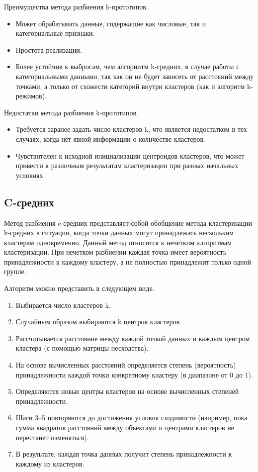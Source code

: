 Преимущества метода разбиения k-прототипов.

\begin{itemize}
    \item Может обрабатывать данные, содержащие как числовые, так и категориальные признаки.
    \item Простота реализации.
    \item Более устойчив к выбросам, чем алгориитм k-средних, в случае работы с категориальными данными, так как он не будет зависеть от расстояний между точками, а только от схожести категорий внутри кластеров (как и алгоритм k-режимов).
\end{itemize}

Недостатки метода разбиения k-прототипов.

\begin{itemize}
    \item Требуется заранее задать число кластеров k, что является недостатком в тех случаях, когда нет явной информации о количестве кластеров.
    \item Чувствителен к исходной инициализации центроидов кластеров, что может привести к различным результатам кластеризации при разных начальных условиях.
\end{itemize}


\subsection{C-средних}

Метод разбиения c-средних \cite{CmeansСlustering} представляет собой обобщение метода кластеризации k-средних в ситуации, когда точки данных могут принадлежать нескольким кластерам одновременно. Данный метод относится к нечетким алгоритмам кластеризации. При нечетком разбиении каждая точка имеет вероятность принадлежности к каждому кластеру, а не полностью принадлежит только одной группе.

Алгоритм можно представить в следующем виде.

\begin{enumerate}
    \item Выбирается число кластеров k.
    \item Случайным образом выбираются k центров кластеров.
    \item Рассчитывается расстояние между каждой точкой данных и каждым центром кластера (с помощью матрицы несходства).
    \item На основе вычисленных расстояний определяется степень (вероятность) принадлежности каждой точки конкретному кластеру (в диапазоне от 0 до 1).
    \item Определяются новые центры кластеров на основе вычисленных степеней принадлежности.
    \item Шаги 3--5 повторяются до достижения условия сходимости (например, пока сумма квадратов расстояний между объектами и центрами кластеров не перестанет изменяться).
    \item В результате, каждая точка данных получит степень принадлежности к каждому из кластеров.
\end{enumerate}

